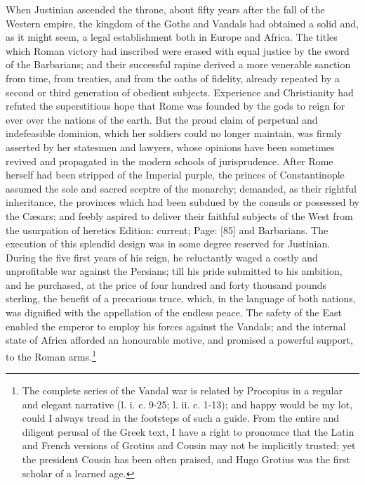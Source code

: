 When Justinian ascended the throne, about fifty years after the fall of the Western empire, the kingdom of the Goths and Vandals had obtained a solid and, as it might seem, a legal establishment both in Europe and Africa. The titles which Roman victory had inscribed were erased with equal justice by the sword of the Barbarians; and their successful rapine derived a more venerable sanction from time, from treaties, and from the oaths of fidelity, already repeated by a second or third generation of obedient subjects. Experience and Christianity had refuted the superstitious hope that Rome was founded by the gods to reign for ever over the nations of the earth. But the proud claim of perpetual and indefeasible dominion, which her soldiers could no longer maintain, was firmly asserted by her statesmen and lawyers, whose opinions have been sometimes revived and propagated in the modern schools of jurisprudence. After Rome herself had been stripped of the Imperial purple, the princes of Constantinople assumed the sole and sacred sceptre of the monarchy; demanded, as their rightful inheritance, the provinces which had been subdued by the consuls or possessed by the Cæsars; and feebly aspired to deliver their faithful subjects of the West from the usurpation of heretics Edition: current; Page: [85] and Barbarians. The execution of this splendid design was in some degree reserved for Justinian. During the five first years of his reign, he reluctantly waged a costly and unprofitable war against the Persians; till his pride submitted to his ambition, and he purchased, at the price of four hundred and forty thousand pounds sterling, the benefit of a precarious truce, which, in the language of both nations, was dignified with the appellation of the endless peace. The safety of the East enabled the emperor to employ his forces against the Vandals; and the internal state of Africa afforded an honourable motive, and promised a powerful support, to the Roman arms.\footnote{The complete series of the Vandal war is related by Procopius in a regular and elegant narrative (l. i. c. 9-25; l. ii. c. 1-13); and happy would be my lot, could I always tread in the footsteps of such a guide. From the entire and diligent perusal of the Greek text, I have a right to pronounce that the Latin and French versions of Grotius and Cousin may not be implicitly trusted; yet the president Cousin has been often praised, and Hugo Grotius was the first scholar of a learned age.}

